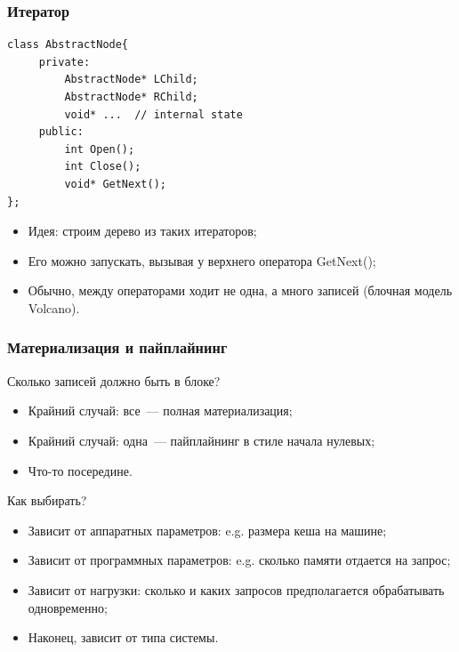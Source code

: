\documentclass{beamer}
\begin{document}
\begin{frame}[fragile]
\frametitle{Итератор}

\lstset{language=C++}
\begin{lstlisting}
class AbstractNode{
     private:
         AbstractNode* LChild;
         AbstractNode* RChild;	
         void* ...	// internal state
     public:
         int Open();
         int Close();
         void* GetNext();
};
\end{lstlisting}
\begin{itemize}
  \item Идея: строим дерево из таких итераторов;
  \item Его можно запускать, вызывая у верхнего оператора GetNext();
  \item Обычно, между операторами ходит не одна, а много записей (блочная модель Volcano).
\end{itemize}

\end{frame}

\begin{frame}[fragile]
\frametitle{Материализация и пайплайнинг}

Сколько записей должно быть в блоке?
\begin{itemize}
    \setlength\itemsep{1em}
	\item Крайний случай: все~--- полная материализация;
	\item Крайний случай: одна~--- пайплайнинг в стиле начала нулевых;
	\item Что-то посередине.
\end{itemize}

Как выбирать? 
	 
\begin{itemize}
	\setlength\itemsep{1em}
	\item Зависит от аппаратных параметров: e.g. размера кеша на машине; 
	\item Зависит от программных параметров: e.g. сколько памяти отдается на запрос;
	\item Зависит от нагрузки: сколько и каких запросов предполагается обрабатывать одновременно;
	\item Наконец, зависит от типа системы.
\end{itemize}

\end{frame}
\end{document}

